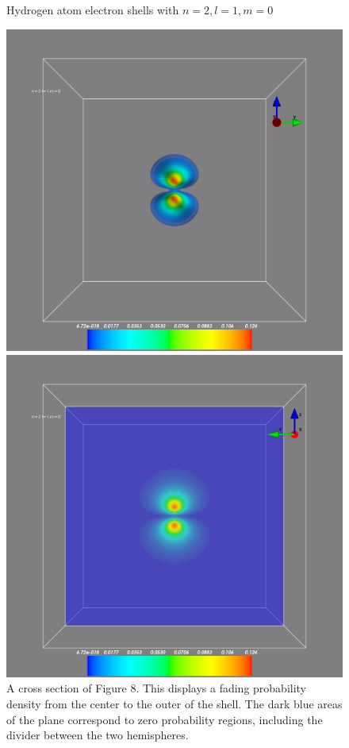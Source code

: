 \documentclass[11pt]{article}
\begin{document}
\begin{figure}[!tbp]
	\centering
	\begin{minipage}[b]{0.6\textwidth}
		\caption{Hydrogen atom electron shells with $n = 2, l = 1, m = 0$}
		\includegraphics[width=\textwidth]{hydro210}
	\end{minipage}
	\hfill
	\begin{minipage}[b]{0.6\textwidth}
		\includegraphics[width=\textwidth]{hydro210_cross}
		\caption{A cross section of Figure 8. This displays a fading probability density from the center to the outer of the shell. The dark blue areas of the plane correspond to zero probability regions, including the divider between the two hemispheres.}
	\end{minipage}
\end{figure}
\end{document}
